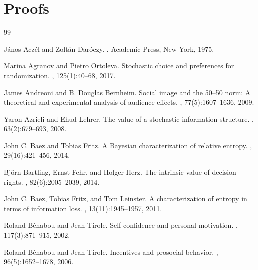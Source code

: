 \documentclass[11pt,a4paper]{article}
\theoremstyle{definition}
\newcommand{\1}{\mathbf 1}
\begin{document}
\clearpage
\appendix

\part*{Proofs}


\clearpage

\clearpage


\clearpage
\begin{thebibliography}{99}
\raggedright

J\'anos Acz\'el and Zolt\'an Dar\'oczy.
.
\newblock Academic Press, New York, 1975.

Marina Agranov and Pietro Ortoleva.
\newblock Stochastic choice and preferences for randomization.
, 125(1):40--68, 2017.

James Andreoni and B. Douglas Bernheim.
\newblock Social image and the 50--50 norm: A theoretical and experimental analysis of audience effects.
, 77(5):1607--1636, 2009.

Yaron Azrieli and Ehud Lehrer.
\newblock The value of a stochastic information structure.
, 63(2):679--693, 2008.

John C. Baez and Tobias Fritz.
\newblock A {B}ayesian characterization of relative entropy.
, 29(16):421--456, 2014.

Bj\"orn Bartling, Ernst Fehr, and Holger Herz.
\newblock The intrinsic value of decision rights.
, 82(6):2005--2039, 2014.

John C. Baez, Tobias Fritz, and Tom Leinster.
\newblock A characterization of entropy in terms of information loss.
, 13(11):1945--1957, 2011.

Roland B\'enabou and Jean Tirole.
\newblock Self-confidence and personal motivation.
, 117(3):871--915, 2002.

Roland B\'enabou and Jean Tirole.
\newblock Incentives and prosocial behavior.
, 96(5):1652--1678, 2006.


\end{thebibliography}
\end{document}
